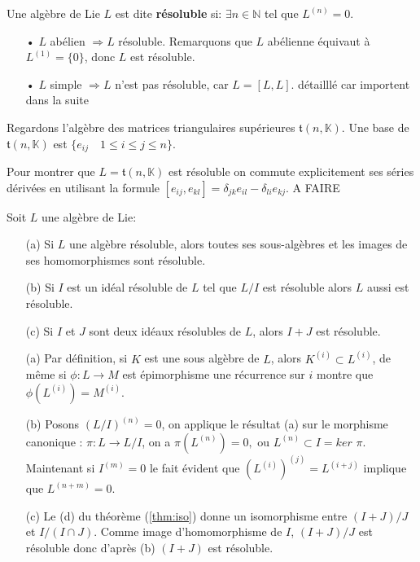 \documentclass[a4paper,openany,12pt]{report}
\newcommand{\KK}{\mathbb{K}}
\newcommand{\NN}{\mathbb{N}}
\newcommand{\ttt}{\mathfrak{t}}
\theoremstyle{break}
{\theorembodyfont{\upshape}
\newtheorem*{rmq}{Remarque :}
\newtheorem*{prv}{Preuve :}
\newtheorem*{ex}{Exemples :}
\newtheorem*{exe}{Exemple : }
\newtheorem*{nota}{Notation :}
\newtheorem*{dem}{D\'emonstration :}}
\begin{document}
\begin{df}
\quad Une algèbre de Lie $L$ est dite \textbf{résoluble} si: $\exists n \in \NN $ tel que $L^{(n)}=0$.
\end{df}

\begin{rmq}
\begin{itemize}
\item[•]  $L$ abélien $\Rightarrow L$ résoluble. Remarquons que $L$ abélienne équivaut à $L^{(1)} = \{0\}$, donc $L$ est résoluble.

\item[•]  $L$ simple $\Rightarrow L$ n'est pas résoluble, car $L = [L,L]$.
détailllé car importent dans la suite
\end{itemize}
\end{rmq}

\begin{ex}
\quad Regardons l'algèbre des matrices triangulaires supérieures $\ttt(n,\KK)$. Une base de $\ttt(n,\KK)$ est $\{ e_{ij}\quad1\leq i \leq j\leq n \}$.

Pour montrer que $L = \ttt(n,\KK)$  est résoluble on commute explicitement ses séries dérivées en utilisant la formule $ [ e_{ij},e_{kl} ]  = \delta_{jk}e_{il}  -  \delta_{li}e_{kj} $.
A FAIRE 
\end{ex}

\begin{prop}\label{prop:solv}
Soit $L$ une algèbre de Lie: 
\begin{itemize}
\item[(a)] Si $L$ une algèbre résoluble, alors toutes ses sous-algèbres et les images de ses homomorphismes sont résoluble.
\item[(b)] Si $I$ est un idéal résoluble de $L$ tel que $L/I$ est résoluble alors $L$ aussi est résoluble.
\item[(c)] Si $I$ et $J$ sont deux idéaux résolubles de $L$, alors $I+J$ est résoluble.
\end{itemize}
\end{prop}

\begin{prv}
\begin{enumerate}
\item[(a)] Par définition, si $K$ est une sous algèbre de $L$, alors $K^{(i)} \subset L^{(i)}$, de même si $\phi: L \rightarrow M$ est épimorphisme une récurrence sur $i$ montre que $\phi\left(L^{(i)}\right)=M^{(i)}$.

\item[(b)] Posons $(L / I)^{(n)}=0$, on applique le résultat (a) sur le morphisme canonique : $\pi: L \rightarrow L / I$, on a  $\pi\left(L^{(n)}\right)=0,$ ou  $L^{(n)} \subset I= ker$ $\pi$. Maintenant si  $I^{(m)}=0$ le fait évident que $\left(L^{(i)}\right)^{(j)}=L^{(i+j)}$ implique que  $L^{(n+m)}=0$. 

\item[(c)] Le (d) du théorème (\ref{thm:iso}) donne un isomorphisme entre $(I+J) / J$ et $I /(I \cap J)$. Comme image d'homomorphisme de $I$, $(I+J) / J$  est résoluble donc d'après (b)  $(I+J)$ est résoluble.
\end{enumerate}
\end{prv}
\end{document}
